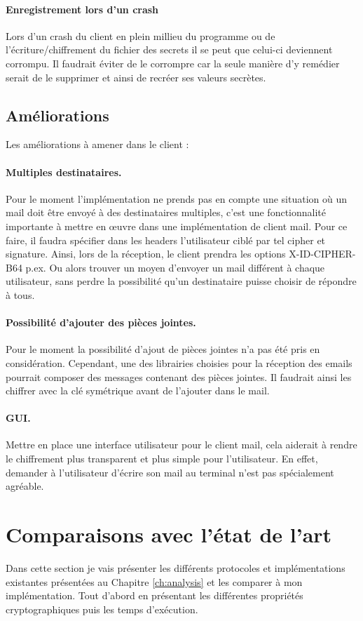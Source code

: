 \paragraph*{Enregistrement lors d'un crash}
Lors d'un crash du client en plein millieu du programme ou de l'écriture/chiffrement du fichier des secrets il se peut que celui-ci deviennent corrompu. Il faudrait éviter de le corrompre car la seule manière d'y remédier serait de le supprimer et ainsi de recréer ses valeurs secrètes.
\subsection{Améliorations}
Les améliorations à amener dans le client :
\paragraph*{Multiples destinataires.}
Pour le moment l'implémentation ne prends pas en compte une situation où un mail doit être envoyé à des destinataires multiples, c'est une fonctionnalité importante à mettre en œuvre dans une implémentation de client mail. Pour ce faire, il faudra spécifier dans les headers l'utilisateur ciblé par tel cipher et signature. Ainsi, lors de la réception, le client prendra les options X-ID-CIPHER-B64 p.ex. Ou alors trouver un moyen d'envoyer un mail différent à chaque utilisateur, sans perdre la possibilité qu'un destinataire puisse choisir de répondre à tous.
\paragraph*{Possibilité d'ajouter des pièces jointes.}
Pour le moment la possibilité d'ajout de pièces jointes n'a pas été pris en considération. Cependant, une des librairies choisies pour la réception des emails pourrait composer des messages contenant des pièces jointes. Il faudrait ainsi les chiffrer avec la clé symétrique avant de l'ajouter dans le mail.
\paragraph*{GUI.}
Mettre en place une interface utilisateur pour le client mail, cela aiderait à rendre le chiffrement plus transparent et plus simple pour l'utilisateur. En effet, demander à l'utilisateur d'écrire son mail au terminal n'est pas spécialement agréable.
\section{Comparaisons avec l'état de l'art}
Dans cette section je vais présenter les différents protocoles et implémentations existantes présentées au Chapitre \ref{ch:analysis} et les comparer à mon implémentation. Tout d'abord en présentant les différentes propriétés cryptographiques puis les temps d'exécution.

